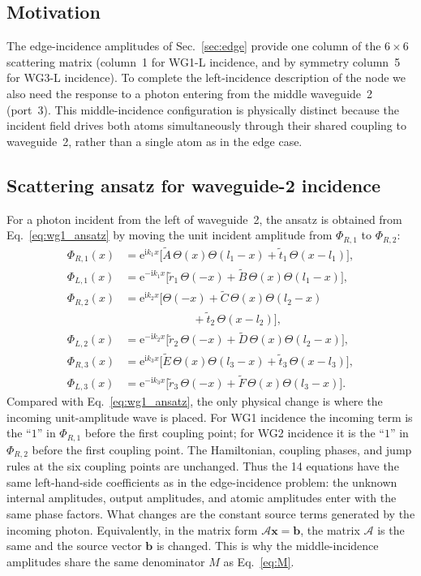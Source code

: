 \documentclass[aps,pra,reprint,superscriptaddress,nofootinbib,longbibliography,floatfix]{revtex4-2}
\newcommand{\ii}{\mathrm{i}}
\newcommand{\ee}{\mathrm{e}}
\begin{document}
\subsection{Motivation}

The edge-incidence amplitudes of Sec.~\ref{sec:edge} provide one column of the $6\times6$ scattering matrix (column~1 for WG1-L incidence, and by symmetry column~5 for WG3-L incidence).
To complete the left-incidence description of the node we also need the response to a photon entering from the middle waveguide~2 (port~3).
This middle-incidence configuration is physically distinct because the incident field drives both atoms simultaneously through their shared coupling to waveguide~2, rather than a single atom as in the edge case.

\subsection{Scattering ansatz for waveguide-2 incidence}

For a photon incident from the left of waveguide~2, the ansatz is obtained from Eq.~\eqref{eq:wg1_ansatz} by moving the unit incident amplitude from $\Phi_{R,1}$ to $\Phi_{R,2}$:
\begin{subequations}
\label{eq:wg2_ansatz}
\begin{align}
\Phi_{R,1}(x) &= \ee^{\ii k_1 x}\bigl[\tilde A\,\Theta(x)\Theta(l_1-x) + \tilde t_1\,\Theta(x-l_1)\bigr],\\
\Phi_{L,1}(x) &= \ee^{-\ii k_1 x}\bigl[\tilde r_1\,\Theta(-x) + \tilde B\,\Theta(x)\Theta(l_1-x)\bigr],\\
\Phi_{R,2}(x) &= \ee^{\ii k_2 x}\bigl[\Theta(-x) + \tilde C\,\Theta(x)\Theta(l_2-x) \nonumber\\
&\qquad\qquad\qquad + \tilde t_2\,\Theta(x-l_2)\bigr],\\
\Phi_{L,2}(x) &= \ee^{-\ii k_2 x}\bigl[\tilde r_2\,\Theta(-x) + \tilde D\,\Theta(x)\Theta(l_2-x)\bigr],\\
\Phi_{R,3}(x) &= \ee^{\ii k_3 x}\bigl[\tilde E\,\Theta(x)\Theta(l_3-x) + \tilde t_3\,\Theta(x-l_3)\bigr],\\
\Phi_{L,3}(x) &= \ee^{-\ii k_3 x}\bigl[\tilde r_3\,\Theta(-x) + \tilde F\,\Theta(x)\Theta(l_3-x)\bigr].
\end{align}
\end{subequations}
Compared with Eq.~\eqref{eq:wg1_ansatz}, the only physical change is where the incoming unit-amplitude wave is placed.
For WG1 incidence the incoming term is the ``$1$'' in $\Phi_{R,1}$ before the first coupling point; for WG2 incidence it is the ``$1$'' in $\Phi_{R,2}$ before the first coupling point.
The Hamiltonian, coupling phases, and jump rules at the six coupling points are unchanged.
Thus the 14 equations have the same left-hand-side coefficients as in the edge-incidence problem: the unknown internal amplitudes, output amplitudes, and atomic amplitudes enter with the same phase factors.
What changes are the constant source terms generated by the incoming photon.
Equivalently, in the matrix form $\mathcal{A}\mathbf{x}=\mathbf{b}$, the matrix $\mathcal{A}$ is the same and the source vector $\mathbf{b}$ is changed.
This is why the middle-incidence amplitudes share the same denominator $M$ as Eq.~\eqref{eq:M}.
\end{document}
